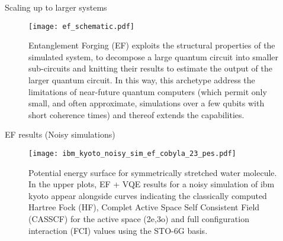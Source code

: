\begin{frame}{Scaling up to larger systems}
    \begin{figure}
      \centering
      \texttt{[image: ef\_schematic.pdf]}
      \caption{
        Entanglement Forging (EF) exploits the structural properties of the
        simulated system, to decompose a large quantum circuit into smaller
        sub-circuits and knitting their results to estimate the output of the
        larger quantum circuit. In this way, this archetype address the
        limitations of near-future quantum computers (which permit only small,
        and often approximate, simulations over a few qubits with short
        coherence times) and thereof extends the capabilities.
      }
    \end{figure}
\end{frame}


\begin{frame}{EF results (Noisy simulations)}
    \begin{figure}
      \centering
      \texttt{[image: ibm\_kyoto\_noisy\_sim\_ef\_cobyla\_23\_pes.pdf]}
      \caption{
        Potential energy surface for symmetrically stretched water molecule. In
        the upper plots, EF + VQE results for a noisy simulation of ibm kyoto appear
        alongside curves indicating the classically computed Hartree Fock (HF),
        Complet Active Space Self Consistent Field (CASSCF) for the active
        space (2e,3o) and full configuration interaction (FCI) values using the STO-6G basis.
      }
    \end{figure}
\end{frame}

